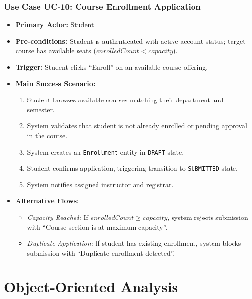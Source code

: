 \documentclass[12pt,a4paper,oneside]{report}
\begin{document}
\subsection{Use Case UC-10: Course Enrollment Application}
\begin{itemize}
    \item \textbf{Primary Actor:} Student
    \item \textbf{Pre-conditions:} Student is authenticated with active account status; target course has available seats ($enrolledCount < capacity$).
    \item \textbf{Trigger:} Student clicks ``Enroll'' on an available course offering.
    \item \textbf{Main Success Scenario:}
    \begin{enumerate}
        \item Student browses available courses matching their department and semester.
        \item System validates that student is not already enrolled or pending approval in the course.
        \item System creates an \texttt{Enrollment} entity in \texttt{DRAFT} state.
        \item Student confirms application, triggering transition to \texttt{SUBMITTED} state.
        \item System notifies assigned instructor and registrar.
    \end{enumerate}
    \item \textbf{Alternative Flows:}
    \begin{itemize}
        \item \textit{Capacity Reached:} If $enrolledCount \ge capacity$, system rejects submission with ``Course section is at maximum capacity''.
        \item \textit{Duplicate Application:} If student has existing enrollment, system blocks submission with ``Duplicate enrollment detected''.
    \end{itemize}
\end{itemize}

\chapter{Object-Oriented Analysis}
\end{document}
